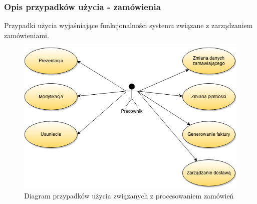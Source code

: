 \subsubsection{Opis przypadków użycia - zamówienia}

Przypadki użycia wyjaśniające funkcjonalności systemu związane z zarządzaniem
zamówieniami.

\begin{figure}[h!]
    \includegraphics[width=\textwidth,
    height=0.5\textheight]{graphics/UseCase/Zamowienia/UseCaseDiagram.png}
  \caption{Diagram przypadków użycia związanych z procesowaniem zamówień}
\end{figure}

